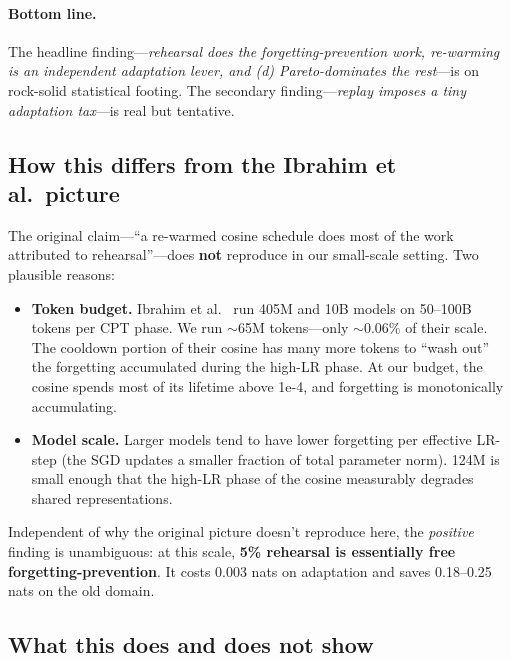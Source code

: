 \documentclass[10pt,letterpaper]{article}
\begin{document}
\paragraph{Bottom line.} The headline finding---\emph{rehearsal does the forgetting-prevention work, re-warming is an independent adaptation lever, and (d) Pareto-dominates the rest}---is on rock-solid statistical footing. The secondary finding---\emph{replay imposes a tiny adaptation tax}---is real but tentative.

\subsection{How this differs from the Ibrahim et al.\ picture}
\label{sec:cpt-compare}

The original claim---``a re-warmed cosine schedule does most of the work attributed to rehearsal''---does \textbf{not} reproduce in our small-scale setting. Two plausible reasons:
\begin{itemize}[leftmargin=1.4em,itemsep=2pt]
  \item \textbf{Token budget.} Ibrahim et al.~\cite{ibrahim_cpt} run 405M and 10B models on 50--100B tokens per CPT phase. We run $\sim$65M tokens---only $\sim$0.06\% of their scale. The cooldown portion of their cosine has many more tokens to ``wash out'' the forgetting accumulated during the high-LR phase. At our budget, the cosine spends most of its lifetime above 1e-4, and forgetting is monotonically accumulating.
  \item \textbf{Model scale.} Larger models tend to have lower forgetting per effective LR-step (the SGD updates a smaller fraction of total parameter norm). 124M is small enough that the high-LR phase of the cosine measurably degrades shared representations.
\end{itemize}
Independent of why the original picture doesn't reproduce here, the \emph{positive} finding is unambiguous: at this scale, \textbf{5\% rehearsal is essentially free forgetting-prevention}. It costs 0.003 nats on adaptation and saves 0.18--0.25 nats on the old domain.

\subsection{What this does and does not show}
\label{sec:cpt-limits}
\end{document}
